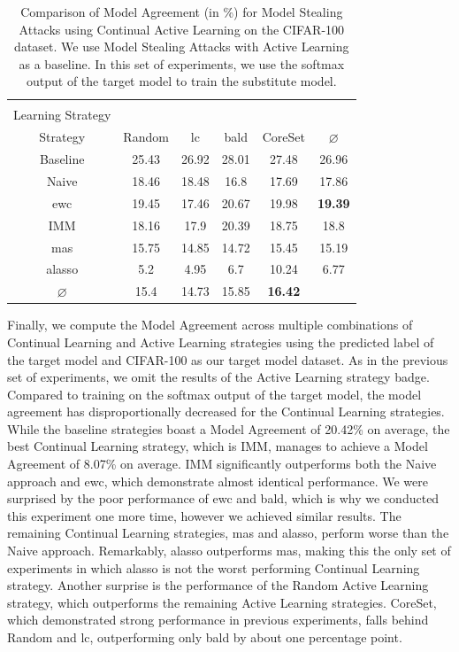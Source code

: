 \begin{table}[h]
    \centering
    \begin{tabular}{c | c c c c | c} 
        \hline
        \diagbox[width=11em]{Active \\ Learning Strategy}{Continual Learning \\ Strategy} & Random & \gls{lc} & \gls{bald} & CoreSet & $\varnothing$\\ 
        \hline 
        Baseline & 25.43 & 26.92 & 28.01 & 27.48 & 26.96 \\
        \hline
        Naive & 18.46 & 18.48 & 16.8 & 17.69 & 17.86\\
        \gls{ewc} & 19.45 & 17.46 & 20.67 & 19.98 & \textbf{19.39}\\
        IMM & 18.16 & 17.9 & 20.39 & 18.75 & 18.8\\
        \gls{mas} & 15.75 & 14.85 & 14.72 & 15.45 & 15.19\\
        \gls{alasso} & 5.2 & 4.95 & 6.7 & 10.24 & 6.77\\
        \hline
        $\varnothing$ & 15.4 & 14.73 & 15.85 & \textbf{16.42}\\
        \hline
    \end{tabular}
    \caption{Comparison of Model Agreement (in \%) for Model Stealing Attacks using Continual Active Learning on the CIFAR-100 dataset. We use Model Stealing Attacks with Active Learning as a baseline. In this set of experiments,
    we use the softmax output of the target model to train the substitute model.}
    \label{fig:ModelStealingCIFAR100Softmax}
\end{table}

Finally, we compute the Model Agreement across multiple combinations of Continual Learning and Active Learning strategies using the predicted label of the target model and CIFAR-100 as our target model dataset. As in the previous set of experiments, we omit the results of
the Active Learning strategy \gls{badge}. Compared to training on the softmax output of the target model, the model agreement has disproportionally decreased for the Continual Learning strategies. While the baseline strategies boast a Model Agreement of 20.42\% on average, the
best Continual Learning strategy, which is IMM, manages to achieve a Model Agreement of 8.07\% on average. IMM significantly outperforms both the Naive approach and \gls{ewc}, which demonstrate almost identical performance. We were surprised by the poor performance of \gls{ewc} and \gls{bald},
which is why we conducted this experiment one more time, however we achieved similar results. The remaining Continual Learning strategies, \gls{mas} and \gls{alasso}, perform worse than the Naive approach. Remarkably, \gls{alasso} outperforms \gls{mas}, making this the only set of experiments in which
\gls{alasso} is not the worst performing Continual Learning strategy. Another surprise is the performance of the Random Active Learning strategy, which outperforms the remaining Active Learning strategies. CoreSet, which demonstrated strong performance in previous experiments, falls behind
Random and \gls{lc}, outperforming only \gls{bald} by about one percentage point. \par


